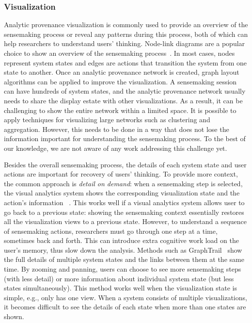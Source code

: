 \subsubsection{Visualization}
Analytic provenance visualization is commonly used to provide an overview of the sensemaking process or reveal any patterns during this process, both of which can help researchers to understand users' thinking. Node-link diagrams are a popular choice to show an overview of the sensemaking process~\cite{vistrails,Pike2007,Shrinivasan2008,Kadivar2009,harvest,Dunne2012}. In most cases, nodes represent system states and edges are actions that transition the system from one state to another. Once an analytic provenance network is created, graph layout algorithms can be applied to improve the visualization. A sensemaking session can have hundreds of system states, and the analytic provenance network usually needs to share the display estate with other visualizations. As a result, it can be challenging to show the entire network within a limited space. It is possible to apply techniques for visualizing large networks such as clustering and aggregation. However, this needs to be done in a way that does not lose the information important for understanding the sensemaking process. To the best of our knowledge, we are not aware of any work addressing this challenge yet.

Besides the overall sensemaking process, the details of each system state and user actions are important for recovery of users' thinking. To provide more context, the common approach is \emph{detail on demand}: when a sensemaking step is selected, the visual analytics system shows the corresponding visualization state and the action's information ~\cite{Pike2007,Shrinivasan2008,Kadivar2009}. This works well if a visual analytics system allows user to go back to a previous state: showing the sensemaking context essentially restores all the visualization views to a previous state. However, to understand a sequence of sensemaking actions, researchers must go through one step at a time, sometimes back and forth. This can introduce extra cognitive work load on the user's memory, thus slow down the analysis. Methods such as GraphTrail~\cite{Dunne2012} show the full details of multiple system states and the links between them at the same time. By zooming and panning, users can choose to see more sensemaking steps (with less detail) or more information about individual system state (but less states simultaneously). This method works well when the visualization state is simple, e.g., only has one view. When a system consists of multiple visualizations, it becomes difficult to see the details of each state when more than one states are shown.

